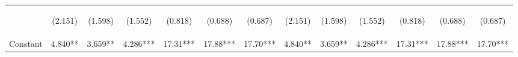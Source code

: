 \documentclass[]{article}
\begin{document}
\begin{center}
\begin{tabular}{lcccccccccccc}
\vspace{4pt} & \begin{footnotesize}(2.151)\end{footnotesize} & \begin{footnotesize}(1.598)\end{footnotesize} & \begin{footnotesize}(1.552)\end{footnotesize} & \begin{footnotesize}(0.818)\end{footnotesize} & \begin{footnotesize}(0.688)\end{footnotesize} & \begin{footnotesize}(0.687)\end{footnotesize} & \begin{footnotesize}(2.151)\end{footnotesize} & \begin{footnotesize}(1.598)\end{footnotesize} & \begin{footnotesize}(1.552)\end{footnotesize} & \begin{footnotesize}(0.818)\end{footnotesize} & \begin{footnotesize}(0.688)\end{footnotesize} & \begin{footnotesize}(0.687)\end{footnotesize} \\
Constant & 4.840** & 3.659** & 4.286*** & 17.31*** & 17.88*** & 17.70*** & 4.840** & 3.659** & 4.286*** & 17.31*** & 17.88*** & 17.70*** \\

\end{tabular}
\end{center}
\end{document}
